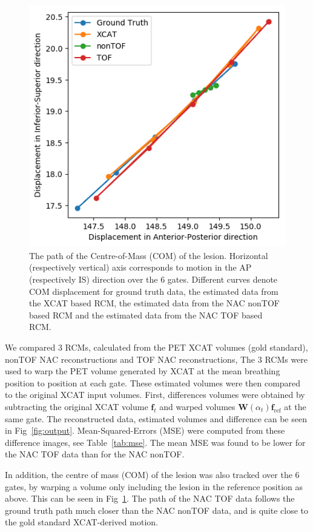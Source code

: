 \documentclass{IEEEtran}
\begin{document}
\begin{figure}
    \vspace{-0.2cm}
    
    \centering
    \includegraphics[width=0.7\linewidth]{figures/com_graph.png}
    \caption{The path of the Centre-of-Mass (COM) of the lesion. Horizontal (respectively vertical) axis corresponds to motion in the AP (respectively IS) direction over the $6$ gates. Different curves denote COM displacement for  ground truth data, the estimated data from the XCAT based RCM, the estimated data from the NAC nonTOF based RCM and the estimated data from the NAC TOF based RCM.}
    \label{fig:com_graph}
    
    \vspace{-0.2cm}
\end{figure}

We compared $3$ RCMs, calculated from the PET XCAT volumes (gold standard), nonTOF NAC reconstructions and TOF NAC reconstructions, The $3$ RCMs were used to warp the PET volume generated by XCAT at the mean breathing position to position at each gate. These estimated volumes were then compared to the original XCAT input volumes. First, differences volumes were obtained by subtracting the original XCAT volume $\mathbf{f}_t$ and warped volumes $\mathbf{W}(\alpha_t) \mathbf{f}_\mathrm{ref}$ at the same gate. The reconstructed data, estimated volumes and difference can be seen in Fig~\ref{fig:output}. Mean-Squared-Errors (MSE) were computed from these difference images, see Table~\ref{tab:mse}. The mean MSE was found to be lower for the NAC TOF data than for the NAC nonTOF.

In addition, the centre of mass (COM) of the lesion was also tracked over the $6$ gates, by warping a volume only including the lesion in the reference position as above. This can be seen in Fig~\ref{fig:com_graph}. The path of the NAC TOF data follows the ground truth path much closer than the NAC nonTOF data, and is quite close to the gold standard XCAT-derived motion.
\end{document}
